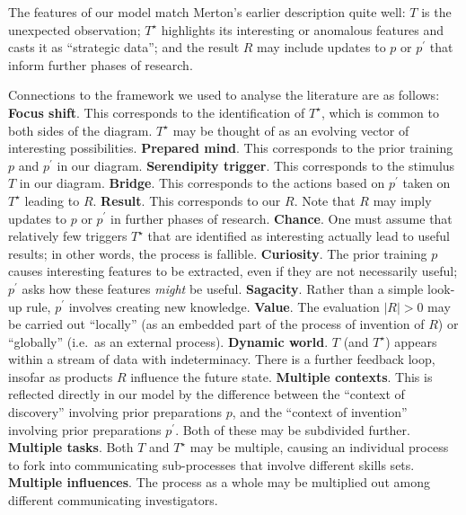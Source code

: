 
The features of our model match Merton's \citeyear{merton1948bearing} earlier description quite
well: $T$ is the unexpected observation; $T^\star$ highlights its
interesting or anomalous features and casts it as ``strategic data''; and the result $R$ may include
updates to $p$ or $p^{\prime}$ that inform further phases of research.  

Connections to the framework we used to analyse the literature are as follows:
%
\textbf{Focus shift}. This corresponds to the identification of
$T^\star$, which is common to both sides of the diagram.
$T^\star$ may be thought of as an evolving vector of interesting
possibilities.
%
\textbf{Prepared mind}. This corresponds to the prior training $p$ and $p^{\prime}$ in our diagram.
%
\textbf{Serendipity trigger}. This corresponds to the stimulus $T$ in our diagram.
%
\textbf{Bridge}. This corresponds to the actions based on $p^{\prime}$ taken on
$T^\star$ leading to $R$.
%
\textbf{Result}. This corresponds to our $R$.  Note that $R$ may imply
  updates to $p$ or $p^{\prime}$ in further phases of research.
%
\textbf{Chance}. One must assume that relatively few triggers $T^\star$ that are
identified as interesting actually lead to useful results; in other
words, the process is fallible.
%
\textbf{Curiosity}. The prior training $p$ causes interesting features to be
  extracted, even if they are not necessarily useful; $p^{\prime}$
  asks how these features \emph{might} be useful.  
%
\textbf{Sagacity}. Rather than a simple look-up rule, $p^{\prime}$ involves creating new knowledge.
%
\textbf{Value}. The evaluation $|R|>0$ may be carried out ``locally'' (as
  an embedded part of the process of invention of $R$) or ``globally''
  (i.e.~as an external process).  
%
\textbf{Dynamic world}. $T$ (and $T^\star$) appears within a stream of data with
  indeterminacy.  There is a further feedback loop, insofar as
  products $R$ influence the future state.
%
\textbf{Multiple contexts}. This is reflected directly in our model by the difference
  between the ``context of discovery'' involving prior preparations
  $p$, and the ``context of invention'' involving prior preparations
  $p^{\prime}$.  Both of these may be subdivided further.
%
\textbf{Multiple tasks}. Both $T$ and $T^\star$ may be multiple, causing an
  individual process to fork into communicating sub-processes that
  involve different skills sets.
%
\textbf{Multiple influences}. The process as a whole may be multiplied out among
different communicating investigators.




